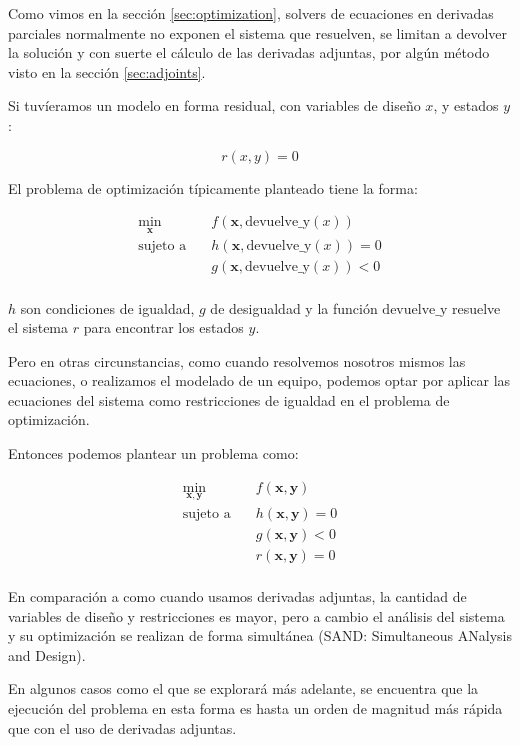 Como vimos en la sección \ref{sec:optimization}, solvers de ecuaciones en
derivadas parciales normalmente no exponen el sistema que resuelven, se limitan
a devolver la solución y con suerte el cálculo de las derivadas adjuntas, por
algún método visto en la sección \ref{sec:adjoints}.

Si tuvíeramos un modelo en forma residual, con variables de diseño $x$, y
estados $y$:

\begin{equation}
	r(x, y) = 0
\end{equation}

El problema de optimización típicamente planteado tiene la forma:

\begin{align}
	\min_{\mathbf{x}} \quad & f(\mathbf{x}, \text{devuelve\_y}(x)) \nonumber     \\
	\text{sujeto a} \quad   & h(\mathbf{x}, \text{devuelve\_y}(x)) = 0 \nonumber \\
	                        & g(\mathbf{x}, \text{devuelve\_y}(x)) < 0 \nonumber \\
\end{align}

$h$ son condiciones de igualdad, $g$ de desigualdad y la función
$\text{devuelve\_y}$ resuelve el sistema $r$ para encontrar los estados $y$.

Pero en otras circunstancias, como cuando resolvemos nosotros mismos las
ecuaciones, o realizamos el modelado de un equipo, podemos optar por aplicar
las ecuaciones del sistema como restricciones de igualdad en el problema de
optimización.

Entonces podemos plantear un problema como:

\begin{align}
	\min_{\mathbf{x}, \mathbf{y}} \quad & f(\mathbf{x}, \mathbf{y}) \nonumber     \\
	\text{sujeto a} \quad               & h(\mathbf{x}, \mathbf{y}) = 0 \nonumber \\
	                                    & g(\mathbf{x}, \mathbf{y}) < 0 \nonumber \\
	                                    & r(\mathbf{x}, \mathbf{y}) = 0 \nonumber \\
\end{align}

En comparación a como cuando usamos derivadas adjuntas, la cantidad de
variables de diseño y restricciones es mayor, pero a cambio el análisis del
sistema y su optimización se realizan de forma simultánea (SAND: Simultaneous
ANalysis and Design).

En algunos casos como el que se explorará más adelante, se encuentra que la
ejecución del problema en esta forma es hasta un orden de magnitud más rápida
que con el uso de derivadas adjuntas.
